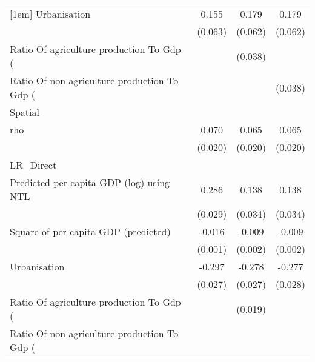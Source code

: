 {\begin{tabular}{l*{3}{c}}
[1em]
Urbanisation        &       0.155\sym{**} &       0.179\sym{***}&       0.179\sym{***}\\
                    &     (0.063)         &     (0.062)         &     (0.062)         \\
[1em]
Ratio Of agriculture production To Gdp (%
                    &                     &     (0.038)         &                     \\
[1em]
Ratio Of non-agriculture production To Gdp (%
                    &                     &                     &     (0.038)         \\
\hline
Spatial             &                     &                     &                     \\
rho                 &       0.070\sym{***}&       0.065\sym{***}&       0.065\sym{***}\\
                    &     (0.020)         &     (0.020)         &     (0.020)         \\
\hline
LR\_Direct           &                     &                     &                     \\
Predicted per capita GDP (log) using NTL&       0.286\sym{***}&       0.138\sym{***}&       0.138\sym{***}\\
                    &     (0.029)         &     (0.034)         &     (0.034)         \\
[1em]
Square of per capita GDP (predicted)&      -0.016\sym{***}&      -0.009\sym{***}&      -0.009\sym{***}\\
                    &     (0.001)         &     (0.002)         &     (0.002)         \\
[1em]
Urbanisation        &      -0.297\sym{***}&      -0.278\sym{***}&      -0.277\sym{***}\\
                    &     (0.027)         &     (0.027)         &     (0.028)         \\
[1em]
Ratio Of agriculture production To Gdp (%
                    &                     &     (0.019)         &                     \\
[1em]
Ratio Of non-agriculture production To Gdp (%

\end{tabular}}
